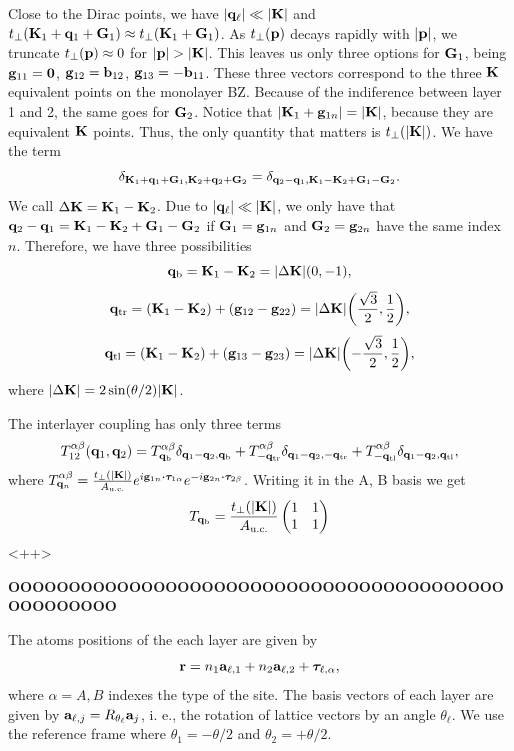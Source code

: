 \documentclass[a4paper,10pt]{article}
\begin{document}
Close to the Dirac points, we have $\abs{{\vb{q}}_\ell} \ll \abs{{\vb{K}}}$ and $t_\perp({\vb{K}}_1+{\vb{q}}_1+{\vb{G}}_1) \approx t_\perp({\vb{K}}_1+{\vb{G}}_1)$. As $t_\perp({\vb{p}})$ decays rapidly with $\abs{{\vb{p}}}$, we truncate $t_\perp({\vb{p}}) \approx 0$ for $\abs{{\vb{p}}} > \abs{{\vb{K}}}$. This leaves us only three options for ${\vb{G}}_1$, being ${\vb{g}}_{11} = {\vb{0}}$, ${\vb{g}}_{12} = {\vb{b}}_{12}$, ${\vb{g}}_{13} = -{\vb{b}}_{11}$. These three vectors correspond to the three ${\vb{K}}$ equivalent points on the monolayer BZ. Because of the indiference between layer 1 and 2, the same goes for ${\vb{G}}_2$. Notice that $\abs{{\vb{K}}_1+{\vb{g}}_{1n}} = \abs{{\vb{K}}}$, because they are equivalent ${\vb{K}}$ points. Thus, the only quantity that matters is $t_\perp(\abs{{\vb{K}}})$. We have the term
$$
\delta_{{\vb{K}}_1+{\vb{q}}_1+{\vb{G}}_1,{\vb{K}}_2+{\vb{q}}_2+{\vb{G}}_2} = \delta_{{\vb{q}}_2-{\vb{q}}_1,{\vb{K}}_1-{\vb{K}}_2+{\vb{G}}_1-{\vb{G}}_2}.
$$
We call $\Delta{\vb{K}} = {\vb{K}}_1-{\vb{K}}_2$. Due to $\abs{{\vb{q}}_\ell} \ll \abs{{\vb{K}}}$, we only have that ${\vb{q}}_2-{\vb{q}}_1 = {\vb{K}}_1-{\vb{K}}_2+{\vb{G}}_1-{\vb{G}}_2$ if ${\vb{G}}_1 = {\vb{g}}_{1n}$ and ${\vb{G}}_2 = {\vb{g}}_{2n}$ have the same index $n$. Therefore, we have three possibilities
$$
{\vb{q}}_\text{b} = {\vb{K}}_1 - {\vb{K}}_2 = \abs{\Delta {\vb{K}}} \qty(0, -1),
$$
$$
{\vb{q}}_\text{tr} = ({\vb{K}}_1 - {\vb{K}}_2) + ({\vb{g}}_{12} - {\vb{g}}_{22}) = \abs{\Delta {\vb{K}}} \qty(\frac{\sqrt{3}}{2}, \frac{1}{2}),
$$
$$
{\vb{q}}_\text{tl} = ({\vb{K}}_1 - {\vb{K}}_2) + ({\vb{g}}_{13} - {\vb{g}}_{23}) = \abs{\Delta {\vb{K}}} \qty(-\frac{\sqrt{3}}{2}, \frac{1}{2}),
$$
where $\abs{\Delta {\vb{K}}} = 2 \sin(\theta/2) \abs{{\vb{K}}}$.

The interlayer coupling has only three terms
$$
T_{12}^{\alpha\beta}({\vb{q}}_1,{\vb{q}}_2) =
T^{\alpha\beta}_{{\vb{q}}_\text{b}} \delta_{{\vb{q}}_1-{\vb{q}}_2, {\vb{q}}_\text{b}} +
T^{\alpha\beta}_{-{\vb{q}}_\text{tr}} \delta_{{\vb{q}}_1-{\vb{q}}_2, -{\vb{q}}_\text{tr}} +
T^{\alpha\beta}_{-{\vb{q}}_\text{tl}} \delta_{{\vb{q}}_1-{\vb{q}}_2, {\vb{q}}_\text{tl}},
$$
where $T^{\alpha\beta}_{\q_n} = \frac{t_\perp(\abs{\K})}{A_{\text{u.c.}}} e^{i \g_{1n} \vdot \bm{\tau}_{1\alpha}}
e^{-i \g_{2n} \vdot \bm{\tau}_{2\beta}}$. Writing it in the A, B basis we get
$$
T_{{\vb{q}}_\text{b}} = \frac{t_\perp(\abs{{\vb{K}}})}{A_{\text{u.c.}}}
\begin{pmatrix}
1 & 1 \\
1 & 1
\end{pmatrix}
$$
<++>

\n

\textbf{OOOOOOOOOOOOOOOOOOOOOOOOOOOOOOOOOOOOOOOOOOOOOOOOOO}

\n

The atoms positions of the each layer are given by
$$
{\vb{r}} = n_1 {\vb{a}}_{\ell,1} + n_2 {\vb{a}}_{\ell,2} + {\bm{\tau}}_{\ell,\alpha},
$$
where $\alpha = A,B$ indexes the type of the site. The basis vectors of each layer are given by ${\vb{a}}_{\ell,j} = R_{\theta_\ell} {\vb{a}}_{j}$, i. e., the rotation of lattice vectors by an angle $\theta_\ell$. We use the reference frame where $\theta_1 = -\theta/2$ and $\theta_2 = +\theta/2$.
\end{document}
